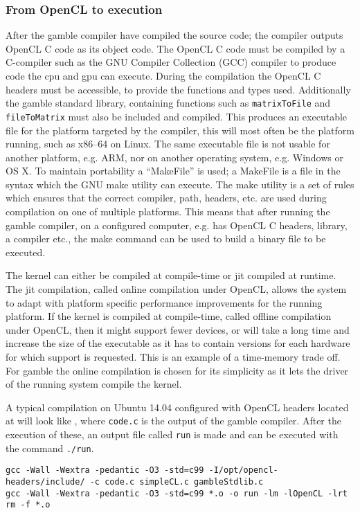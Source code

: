 \subsubsection*{From OpenCL to execution}\label{ssub:makefile}
After the \gls{gamble} compiler have compiled the source code; the compiler outputs OpenCL C code as its object code.
The OpenCL C code must be compiled by a C-compiler such as the GNU Compiler Collection (GCC) compiler to produce code the \acrshort{cpu} and \acrshort{gpu} can execute.
During the compilation the OpenCL C headers must be accessible, to provide the functions and types used. 
Additionally the \gls{gamble} standard library, containing functions such as \texttt{matrixToFile} and \texttt{fileToMatrix} must also be included and compiled. 
This produces an executable file for the platform targeted by the compiler, this will most often be the platform running, such as x86--64 on Linux.
The same executable file is not usable for another platform, e.g. ARM, nor on another operating system, e.g. Windows or OS X.
To maintain portability a ``MakeFile'' is used; a MakeFile is a file in the syntax which the GNU make utility can execute. 
The make utility is a set of rules which ensures that the correct compiler, path, headers, etc. are used during compilation on one of multiple platforms. 
This means that after running the \gls{gamble} compiler, on a configured computer, e.g. has OpenCL C headers, library, a compiler etc., the make command can be used to build a binary file to be executed.

The kernel can either be compiled at compile-time or \acrshort{jit} compiled at runtime.
The \acrshort{jit} compilation, called online compilation under OpenCL, allows the system to adapt with platform specific performance improvements for the running platform.
If the kernel is compiled at compile-time, called offline compilation under OpenCL, then it might support fewer devices, or will take a long time and increase the size of the executable as it has to contain versions for each hardware for which support is requested. \citep{openclbookjit}
This is an example of a time-memory trade off. 
For \gls{gamble} the online compilation is chosen for its simplicity as it lets the driver of the running system compile the kernel. 

A typical compilation on Ubuntu 14.04 configured with OpenCL headers located at  will look like , where \texttt{code.c} is the output of the \gls{gamble} compiler.
After the execution of these, an output file called \texttt{run} is made and can be executed with the command \texttt{./run}. 

\begin{lstlisting}[caption=The commands executed by the make command according to the rules of the MakeFile,numbers=none,frame=tlrb,label={lst:makecommands}]
gcc -Wall -Wextra -pedantic -O3 -std=c99 -I/opt/opencl-headers/include/ -c code.c simpleCL.c gambleStdlib.c
gcc -Wall -Wextra -pedantic -O3 -std=c99 *.o -o run -lm -lOpenCL -lrt
rm -f *.o
\end{lstlisting}
